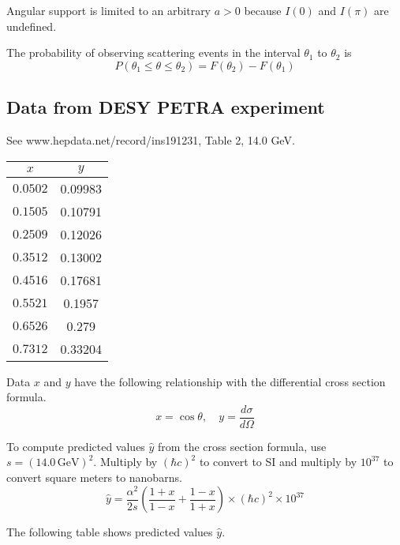 \documentclass[12pt]{article}
\begin{document}
Angular support is limited to an arbitrary $a>0$
because $I(0)$ and $I(\pi)$ are undefined.

\bigskip
The probability of observing scattering events in the interval
$\theta_1$ to $\theta_2$ is
\begin{equation*}
P(\theta_1\le\theta\le\theta_2)=F(\theta_2)-F(\theta_1)
\end{equation*}

\subsection*{Data from DESY PETRA experiment}
\noindent
See www.hepdata.net/record/ins191231, Table 2, 14.0 GeV.

\begin{center}
\begin{tabular}{|c|c|}
\hline
$x$ & $y$\\
\hline
$0.0502$ & 0.09983\\
$0.1505$ & 0.10791\\
$0.2509$ & 0.12026\\
$0.3512$ & 0.13002\\
$0.4516$ & 0.17681\\
$0.5521$ & 0.1957\phantom{0}\\
$0.6526$ & 0.279\phantom{00}\\
$0.7312$ & 0.33204\\
\hline
\end{tabular}
\end{center}

\noindent
Data $x$ and $y$ have the following relationship
with the differential cross section formula.
\begin{equation*}
x=\cos\theta,
\quad
y=\frac{d\sigma}{d\Omega}
\end{equation*}

\noindent
To compute predicted values $\hat{y}$ from the cross section formula,
use $s=(14.0\,\text{GeV})^2$.
Multiply by $(\hbar c)^2$ to convert to SI
and multiply by $10^{37}$ to convert square meters to nanobarns.
\begin{equation*}
\hat{y}
=
\frac{\alpha^2}{2s}
\left(
\frac{1+x}{1-x}+
\frac{1-x}{1+x}
\right)
\times(\hbar c)^2
\times10^{37}
\end{equation*}

\noindent
The following table shows predicted values $\hat{y}$.
\end{document}
